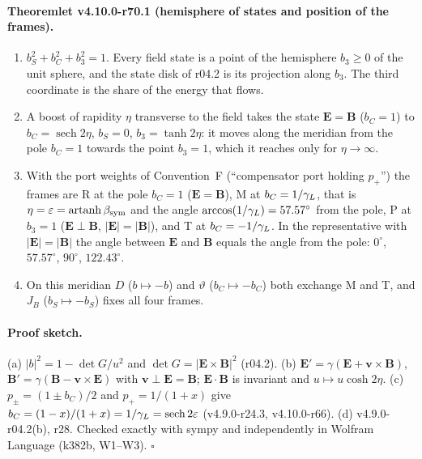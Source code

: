 \paragraph{Theoremlet v4.10.0-r70.1 (hemisphere of states and position of the frames).}
\begin{enumerate}[leftmargin=2em]
\item[(a)] \(b_S^2+b_C^2+b_3^2=1\).  Every field state is a point of the hemisphere \(b_3\ge0\) of the unit sphere, and the state disk of
r04.2 is its projection along \(b_3\).  The third coordinate is the share of the energy that flows.
\item[(b)] A boost of rapidity \(\eta\) transverse to the field takes the state \(\mathbf E=\mathbf B\) (\(b_C=1\)) to
\(b_C=\operatorname{sech}2\eta\), \(b_S=0\), \(b_3=\tanh2\eta\): it moves along the meridian from the pole \(b_C=1\) towards the point
\(b_3=1\), which it reaches only for \(\eta\to\infty\).
\item[(c)] With the port weights of Convention~F (``compensator port holding \(p_+\)'') the frames are R at the pole \(b_C=1\)
(\(\mathbf E=\mathbf B\)), M at \(b_C=1/\gamma_L\), that is \(\eta=\varepsilon=\operatorname{artanh}\beta_{\mathrm{sym}}\) and the angle
\(\arccos(1/\gamma_L)=57.57^\circ\) from the pole, P at \(b_3=1\) (\(\mathbf E\perp\mathbf B\), \(|\mathbf E|=|\mathbf B|\)), and T at \(b_C=-1/\gamma_L\).
In the representative with \(|\mathbf E|=|\mathbf B|\) the angle between \(\mathbf E\) and \(\mathbf B\) equals the angle from the pole:
\(0^\circ\), \(57.57^\circ\), \(90^\circ\), \(122.43^\circ\).
\item[(d)] On this meridian \(D\) (\(b\mapsto-b\)) and \(\vartheta\) (\(b_C\mapsto-b_C\)) both exchange M and T, and \(J_B\)
(\(b_S\mapsto-b_S\)) fixes all four frames.
\end{enumerate}

\paragraph{Proof sketch.}
(a) \(|b|^2=1-\det G/u^2\) and \(\det G=|\mathbf E\times\mathbf B|^2\) (r04.2).  (b) \(\mathbf E'=\gamma(\mathbf E+\mathbf v\times\mathbf B)\),
\(\mathbf B'=\gamma(\mathbf B-\mathbf v\times\mathbf E)\) with \(\mathbf v\perp\mathbf E=\mathbf B\); \(\mathbf E\cdot\mathbf B\) is invariant and
\(u\mapsto u\cosh2\eta\).  (c) \(p_\pm=(1\pm b_C)/2\) and \(p_+=1/(1+x)\) give \(b_C=(1-x)/(1+x)=1/\gamma_L=\operatorname{sech}2\varepsilon\)
(v4.9.0-r24.3, v4.10.0-r66).  (d) v4.9.0-r04.2(b), r28.  Checked exactly with sympy and independently in Wolfram Language (k382b, W1--W3).
\(\square\)

